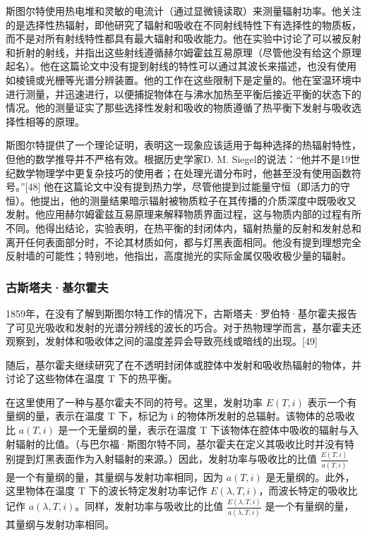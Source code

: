 斯图尔特使用热电堆和灵敏的电流计（通过显微镜读取）来测量辐射功率。他关注的是选择性热辐射，即他研究了辐射和吸收在不同射线特性下有选择性的物质板，而不是对所有射线特性都具有最大辐射和吸收能力。他在实验中讨论了可以被反射和折射的射线，并指出这些射线遵循赫尔姆霍兹互易原理（尽管他没有给这个原理起名）。他在这篇论文中没有提到射线的特性可以通过其波长来描述，也没有使用如棱镜或光栅等光谱分辨装置。他的工作在这些限制下是定量的。他在室温环境中进行测量，并迅速进行，以便捕捉物体在与沸水加热至平衡后接近平衡的状态下的情况。他的测量证实了那些选择性发射和吸收的物质遵循了热平衡下发射与吸收选择性相等的原理。

斯图尔特提供了一个理论证明，表明这一现象应该适用于每种选择的热辐射特性，但他的数学推导并不严格有效。根据历史学家D. M. Siegel的说法：“他并不是19世纪数学物理学中更复杂技巧的使用者；在处理光谱分布时，他甚至没有使用函数符号。”[48] 他在这篇论文中没有提到热力学，尽管他提到过能量守恒（即活力的守恒）。他提出，他的测量结果暗示辐射被物质粒子在其传播的介质深度中既吸收又发射。他应用赫尔姆霍兹互易原理来解释物质界面过程，这与物质内部的过程有所不同。他得出结论，实验表明，在热平衡的封闭体内，辐射热量的反射和发射总和离开任何表面部分时，不论其材质如何，都与灯黑表面相同。他没有提到理想完全反射墙的可能性；特别地，他指出，高度抛光的实际金属仅吸收极少量的辐射。
\subsubsection{古斯塔夫·基尔霍夫}
1859年，在没有了解到斯图尔特工作的情况下，古斯塔夫·罗伯特·基尔霍夫报告了可见光吸收和发射的光谱分辨线的波长的巧合。对于热物理学而言，基尔霍夫还观察到，发射体和吸收体之间的温度差异会导致亮线或暗线的出现。[49]

随后，基尔霍夫继续研究了在不透明封闭体或腔体中发射和吸收热辐射的物体，并讨论了这些物体在温度 T 下的热平衡。

在这里使用了一种与基尔霍夫不同的符号。这里，发射功率 \( E(T, i) \) 表示一个有量纲的量，表示在温度 T 下，标记为 i 的物体所发射的总辐射。该物体的总吸收比 \( a(T, i) \) 是一个无量纲的量，表示在温度 T 下该物体在腔体中吸收的辐射与入射辐射的比值。（与巴尔福·斯图尔特不同，基尔霍夫在定义其吸收比时并没有特别提到灯黑表面作为入射辐射的来源。）因此，发射功率与吸收比的比值 \( \frac{E(T, i)}{a(T, i)} \) 是一个有量纲的量，其量纲与发射功率相同，因为 \( a(T, i) \) 是无量纲的。此外，这里物体在温度 T 下的波长特定发射功率记作 \( E(\lambda, T, i) \)，而波长特定的吸收比记作 \( a(\lambda, T, i) \)。同样，发射功率与吸收比的比值 \( \frac{E(\lambda, T, i)}{a(\lambda, T, i)} \) 是一个有量纲的量，其量纲与发射功率相同。

